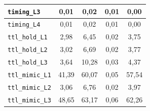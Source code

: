 \begin{table}[!ht]
\begin{tabular}{|l|c|c|c|c|}
        \hline
        \texttt{timing\_L3} & 0,01 & 0,02 & 0,01 & 0,00 \\
        \hline
        \texttt{timing\_L4} & 0,01 & 0,02 & 0,01 & 0,00 \\
        \hline
        \texttt{ttl\_hold\_L1} & 2,98 & 6,45 & 0,02 & 3,75 \\
        \hline
        \texttt{ttl\_hold\_L2} & 3,02 & 6,69 & 0,02 & 3,77 \\
        \hline
        \texttt{ttl\_hold\_L3} & 3,64 & 10,28 & 0,03 & 4,37 \\
        \hline
        \texttt{ttl\_mimic\_L1} & 41,39 & 60,07 & 0,05 & 57,54 \\
        \hline
        \texttt{ttl\_mimic\_L2} & 3,06 & 6,76 & 0,02 & 3,97 \\
        \hline
        \texttt{ttl\_mimic\_L3} & 48,65 & 63,17 & 0,06 & 62,26 \\
        \hline
    \end{tabular}
    \label{tab:anexa-o6-tr}
\end{table}
